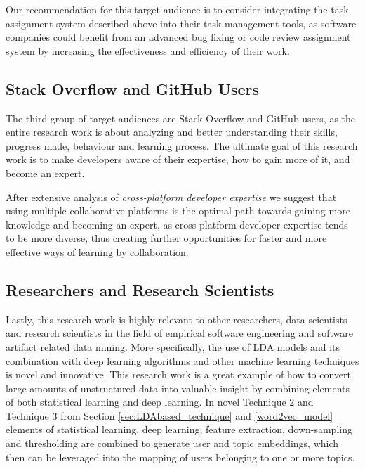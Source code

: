             Our recommendation for this target audience is to consider integrating the task assignment system described above into their task management tools, as software companies could benefit from an advanced bug fixing or code review assignment system by increasing the effectiveness and efficiency of their work.
        
        \subsection{Stack Overflow and GitHub Users}
        
            The third group of target audiences are Stack Overflow and GitHub users, as the entire research work is about analyzing and better understanding their skills, progress made, behaviour and learning process. The ultimate goal of this research work is to make developers aware of their expertise, how to gain more of it, and become an expert. 
            
            After extensive analysis of \emph{cross-platform developer expertise} we suggest that using multiple collaborative platforms is the optimal path towards gaining more knowledge and becoming an expert, as cross-platform developer expertise tends to be more diverse, thus creating further opportunities for faster and more effective ways of learning by collaboration. 
            
        \subsection{Researchers and Research Scientists}
        
            Lastly, this research work is highly relevant to other researchers, data scientists and research scientists in the field of empirical software engineering and software artifact related data mining. More specifically, the use of LDA models and its combination with deep learning algorithms and other machine learning techniques is novel and innovative. This research work is a great example of how to convert large amounts of unstructured data into valuable insight by combining elements of both statistical learning and deep learning. In novel Technique 2 and Technique 3 from Section \ref{sec:LDAbased_technique} and \ref{word2vec_model} elements of statistical learning, deep learning, feature extraction, down-sampling and thresholding are combined to generate user and topic embeddings, which then can be leveraged into the mapping of users belonging to one or more topics. 
            
